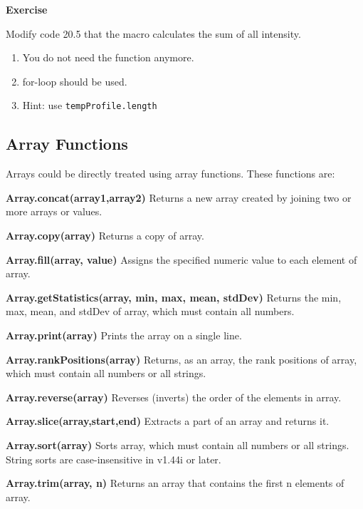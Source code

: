 \documentclass[11pt,a4paper,oneside]{report}
\newenvironment{indentexercise}[1]%
{{\setlength{\leftmargin}{2em}}%
\textbf{Exercise \thesubsection-#1}%
\begin{list}{}%
	\item%
}
{\end{list}}
\newenvironment{indentCom}%
{\begin{list}{}%
         {\setlength{\leftmargin}{1em}}%
         \item[]%
}
{\end{list}}
\newcommand{\ilcom}[1]{\texttt{\small#1}}
\begin{document}
\begin{indentexercise}{1}
Modify code 20.5 that the macro calculates the sum of all intensity.\\
\begin{enumerate}
\item You do not need the function anymore. 
\item for-loop should be used.
\item Hint: use \ilcom{tempProfile.length}
\end{enumerate}
\end{indentexercise}

\subsection{Array Functions}

Arrays could be directly treated using array functions. These functions are:
\begin{shaded}\begin{indentCom}
\item \textbf{Array.concat(array1,array2)} Returns a new array created by
joining two or more arrays or values. 
\item \textbf{Array.copy(array)} Returns a copy of array. 
\item \textbf{Array.fill(array, value)} Assigns the specified numeric value to
each element of array.
\item \textbf{Array.getStatistics(array, min, max, mean, stdDev)} Returns the
min, max, mean, and stdDev of array, which must contain all numbers.
\item \textbf{Array.print(array)} Prints the array on a single line. 
\item \textbf{Array.rankPositions(array)} Returns, as an array, the rank
positions of array, which must contain all numbers or all strings. 
\item \textbf{Array.reverse(array)} Reverses (inverts) the order of the
elements in array. 
\item \textbf{Array.slice(array,start,end)} Extracts a part of an array and
returns it. 
\item \textbf{Array.sort(array)} Sorts array, which must contain all numbers
or all strings. String sorts are case-insensitive in v1.44i or later.
\item \textbf{Array.trim(array, n)} Returns an array that contains the first n
elements of array.
\end{indentCom}\end{shaded}
\end{document}
